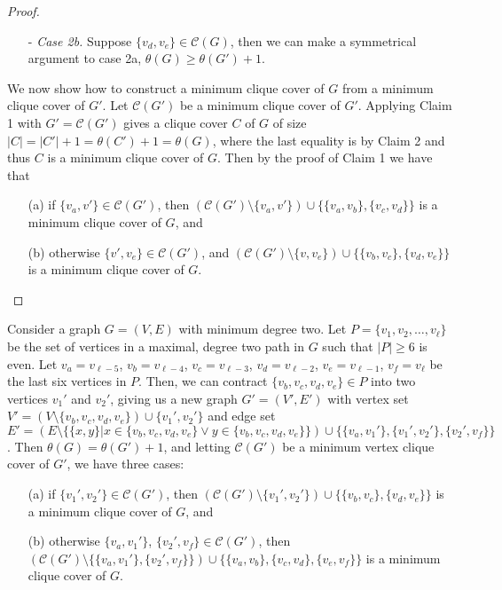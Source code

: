 \documentclass[../techreport.tex]{subfiles}
\begin{document}
\begin{proof}
\begin{itemize}
		\item[-]\emph{Case 2b.} Suppose $\{v_d, v_e\} \in \mathcal{C}(G)$, then we can make a symmetrical argument to case 2a, $\theta(G) \geq \theta(G') + 1$.
	\end{itemize}

	We now show how to construct a minimum clique cover of $G$ from a minimum clique cover of $G'$. Let $\mathcal{C}(G')$ be a minimum clique cover of $G'$. Applying Claim 1 with $G' = \mathcal{C}(G')$ gives a clique cover $C$ of $G$ of size $|C| = |C'| + 1 = \theta(C') + 1 = \theta(G)$, where the last equality is by Claim 2 and thus $C$ is a minimum clique cover of $G$. Then by the proof of Claim 1 we have that
	\begin{itemize}
		\item[(a)] if $\{v_a, v'\} \in \mathcal{C}(G')$, then $(\mathcal{C}(G') \setminus \{v_a, v'\}) \cup \{\{v_a, v_b\}, \{v_c, v_d\}\}$ is a minimum clique cover of $G$, and

		\item[(b)] otherwise $\{v', v_e\} \in \mathcal{C}(G')$, and $(\mathcal{C}(G') \setminus \{v, v_e\}) \cup \{\{v_b, v_c\}, \{v_d, v_e\}\}$ is a minimum clique cover of $G$.
	\end{itemize}
\end{proof}

\begin{lemma}
	Consider a graph $G = (V, E)$ with minimum degree two. Let $P = \{v_1, v_2, \dots, v_{\ell}\}$ be the set of vertices in a maximal, degree two path in $G$ such that $|P| \geq 6$ is even. Let $v_a = v_{\ell - 5}$, $v_b = v_{\ell - 4}$, $v_c = v_{\ell - 3}$, $v_d = v_{\ell - 2}$, $v_e = v_{\ell - 1}$, $v_f = v_{\ell}$ be the last six vertices in $P$. Then, we can contract $\{v_b, v_c, v_d, v_e\} \in P$ into two vertices $v_1'$ and $v_2'$, giving us a new graph $G' = (V', E')$ with vertex set $V' = (V \setminus \{v_b, v_c, v_d, v_e\}) \cup \{v_1', v_2'\}$ and edge set $E' = (E \setminus \{\{x, y\}| x \in \{v_b, v_c, v_d, v_e\} \lor y \in \{v_b, v_c, v_d, v_e\}\}) \cup \{\{v_a, v_1'\}, \{v_1', v_2'\}, \{v_2', v_f\}\}$. Then $\theta(G) = \theta(G') + 1$, and letting $\mathcal{C}(G')$ be a minimum vertex clique cover of $G'$, we have three cases:
	\begin{itemize}
		\item[(a)] if $\{v_1', v_2'\} \in \mathcal{C}(G')$, then $(\mathcal{C}(G') \setminus \{v_1', v_2'\}) \cup \{\{v_b, v_c\}, \{v_d, v_e\}\}$ is a minimum clique cover of $G$, and

		\item[(b)] otherwise $\{v_a, v_1'\}$, $\{v_2', v_f\} \in \mathcal{C}(G')$, then $(\mathcal{C}(G') \setminus \{\{v_a, v_1'\}, \{v_2', v_f\}\}) \cup \{\{v_a, v_b\}, \{v_c, v_d\}, \{v_e, v_f\}\}$ is a minimum clique cover of $G$.
	\end{itemize}
\end{lemma}
\end{document}
